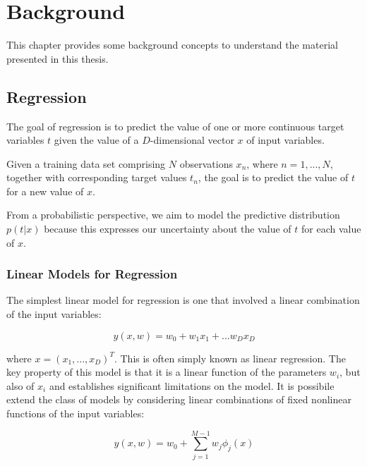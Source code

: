 \chapter{Background}
\label{chap:background}
This chapter provides some background concepts to understand the material 
presented in this thesis. 


\section{Regression}
The goal of regression is to predict the value of one or more continuous target variables $t$ given the value of a $D$-dimensional vector $x$ of input variables. \cite[]{bishop:2006:PRML}

\noindent Given a training data set comprising $N$ observations ${x_n}$, where $n = 1,...,N$,
together with corresponding target values ${t_n}$, the goal is to predict the value of $t$
for a new value of $x$.

\noindent From a probabilistic perspective, we aim to model the predictive distribution $p(t|x)$ because this expresses our uncertainty about the value of $t$ for each value of $x$.

\subsection{Linear Models for Regression}
\label{subsec:reglinuniv}

The simplest linear model for regression is one that involved a linear combination of the input variables:
\begin{Equation}[H]
	\centering
	\begin{equation} \label{eq:lincomb}
		y(x,w)=w_0 + w_1x_1+...w_D x_D
	\end{equation}
\end{Equation}

\noindent where $x=(x_1,...,x_D)^T$. This is often simply known as linear regression. The key property of this model is that it is a linear function of the parameters $w_i$, but also of $x_i$ and establishes significant limitations on the model. It is possibile extend the class of models by considering linear combinations of fixed nonlinear functions of the input variables:
\begin{Equation}[H]
	\centering
	\begin{equation} \label{eq:lincombbasis}
		y(x,w)=w_0 + \sum_{j=1}^{M-1}w_j \phi_j(x)
	\end{equation}
\end{Equation}

